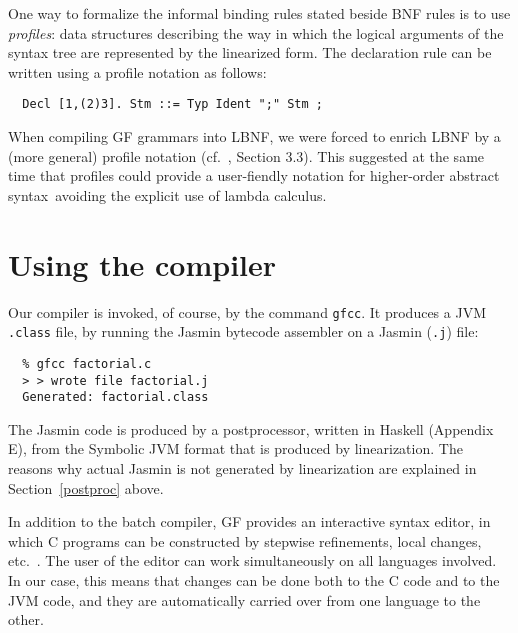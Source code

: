 \documentclass[12pt]{article}
\newcommand{\HOAS}{higher-order abstract syntax}
\newcommand{\empha}[1]{{\em #1}}
\newcommand{\commentOut}[1]{}
\begin{document}
One way to formalize the informal binding rules stated beside
BNF rules is to use \empha{profiles}: data structures describing
the way in which the logical arguments of the syntax tree are
represented by the linearized form. The declaration rule can be
written using a profile notation as follows:
\begin{verbatim}
  Decl [1,(2)3]. Stm ::= Typ Ident ";" Stm ;
\end{verbatim}
When compiling GF grammars into LBNF, we were forced to enrich
LBNF by a (more general) profile notation
(cf.\ \cite{gf-jfp}, Section 3.3). This suggested at the same
time that profiles could provide a user-fiendly notation for
\HOAS\ avoiding the explicit use of lambda calculus.



\section{Using the compiler}

Our compiler is invoked, of course, by the command \texttt{gfcc}.
It produces a JVM \texttt{.class} file, by running the
Jasmin bytecode assembler \cite{jasmin} on a Jasmin (\texttt{.j})
file:
\begin{verbatim}
  % gfcc factorial.c
  > > wrote file factorial.j
  Generated: factorial.class
\end{verbatim}
The Jasmin code is produced by a postprocessor, written in Haskell
(Appendix E), from the Symbolic JVM format that is produced by
linearization. The reasons why actual Jasmin is not generated
by linearization are explained in Section~\ref{postproc} above.

In addition to the batch compiler, GF provides an interactive 
syntax editor, in which C programs can be constructed by
stepwise refinements, local changes, etc.\ \cite{khegai}. The user of the
editor can work simultaneously on all languages involved.
In our case, this means that changes can be done both to
the C code and to the JVM code, and they are automatically
carried over from one language to the other.
\commentOut{
A screen dump of the editor is shown in Fig~\ref{demo}.

\begin{figure}
\centerline{\psfig{figure=demo2.epsi}} \caption{
GF editor session where an integer
expression is expected to be given. The left window shows the
abstract syntax tree, and the right window the evolving C and
JVM code. The editor focus is shadowed, and the refinement alternatives
are shown in a pop-up window.
}
\label{demo}
\end{figure}
}
\end{document}
